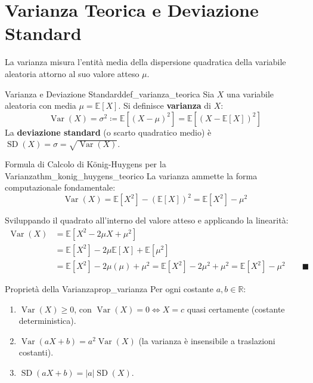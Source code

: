\section{Varianza Teorica e Deviazione Standard}
\label{sec:varianza_teorica}

La varianza misura l'entità media della dispersione quadratica della variabile aleatoria attorno al suo valore atteso $\mu$.

\begin{definizione}{Varianza e Deviazione Standard}{def_varianza_teorica}
Sia $X$ una variabile aleatoria con media $\mu = \mathbb{E}[X]$. Si definisce \textbf{varianza} di $X$:
\begin{equation}
    \operatorname{Var}(X) = \sigma^2 \coloneqq \mathbb{E}\left[(X - \mu)^2\right] = \mathbb{E}\left[(X - \mathbb{E}[X])^2\right]
\end{equation}
La \textbf{deviazione standard} (o scarto quadratico medio) è $\operatorname{SD}(X) = \sigma = \sqrt{\operatorname{Var}(X)}$.
\end{definizione}

\begin{teorema}{Formula di Calcolo di König-Huygens per la Varianza}{thm_konig_huygens_teorico}
La varianza ammette la forma computazionale fondamentale:
\begin{equation}
    \operatorname{Var}(X) = \mathbb{E}[X^2] - (\mathbb{E}[X])^2 = \mathbb{E}[X^2] - \mu^2
\end{equation}
\end{teorema}

\begin{dimostrazione}
Sviluppando il quadrato all'interno del valore atteso e applicando la linearità:
\begin{align}
    \operatorname{Var}(X) &= \mathbb{E}\left[X^2 - 2\mu X + \mu^2\right] \\
    &= \mathbb{E}[X^2] - 2\mu \mathbb{E}[X] + \mathbb{E}[\mu^2] \\
    &= \mathbb{E}[X^2] - 2\mu(\mu) + \mu^2 = \mathbb{E}[X^2] - 2\mu^2 + \mu^2 = \mathbb{E}[X^2] - \mu^2 \qquad \blacksquare
\end{align}
\end{dimostrazione}

\begin{proprieta}{Proprietà della Varianza}{prop_varianza}
Per ogni costante $a, b \in \mathbb{R}$:
\begin{enumerate}
    \item $\operatorname{Var}(X) \ge 0$, con $\operatorname{Var}(X) = 0 \iff X = c$ quasi certamente (costante deterministica).
    \item $\operatorname{Var}(aX + b) = a^2 \operatorname{Var}(X)$ (la varianza è insensibile a traslazioni costanti).
    \item $\operatorname{SD}(aX + b) = |a| \operatorname{SD}(X)$.
\end{enumerate}
\end{proprieta}

